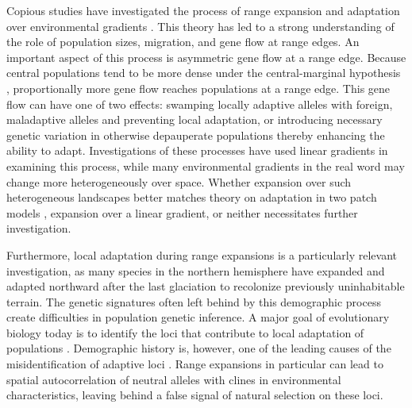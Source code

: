 Copious studies have investigated the process of range expansion and adaptation over environmental gradients \citep{Kirkpatrick:1997, Barton:2001, Bridle:2010, Polechova:2015, GarciaRamos:1997}. This theory has led to a strong understanding of the role of population sizes, migration, and gene flow at range edges. An important aspect of this process is asymmetric gene flow at a range edge. Because central populations tend to be more dense under the central-marginal hypothesis \citep{Brown:1984, Eckert:2008}, proportionally more gene flow reaches populations at a range edge. This gene flow can have one of two effects: swamping locally adaptive alleles with foreign, maladaptive alleles and preventing local adaptation, or introducing necessary genetic variation in otherwise depauperate populations thereby enhancing the ability to adapt. Investigations of these processes have used linear gradients in examining this process, while many environmental gradients in the real word may change more heterogeneously over space. Whether expansion over such heterogeneous landscapes better matches theory on adaptation in two patch models \citep{Gomulkiewicz:1995, Ronce:2001, Holt:1997, Gomulkiewicz:1999}, expansion over a linear gradient, or neither necessitates further investigation.

Furthermore, local adaptation during range expansions is a particularly relevant investigation, as many species in the northern hemisphere have expanded and adapted northward after the last glaciation to recolonize previously uninhabitable terrain. The genetic signatures often left behind by this demographic process create difficulties in population genetic inference. A major goal of evolutionary biology today is to identify the loci that contribute to local adaptation of populations \citep{Savolainen:2013, Whitlock:2015, LeCorre:2012, Coop:2010}. Demographic history is, however, one of the leading causes of the misidentification of adaptive loci \citep{Whitlock:2015}. Range expansions in particular can lead to spatial autocorrelation of neutral alleles with clines in environmental characteristics, leaving behind a false signal of natural selection on these loci.

